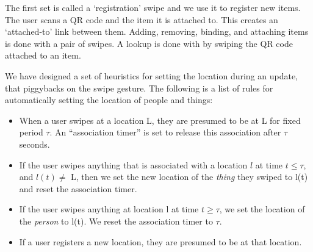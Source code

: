 
The first set is called a `registration' swipe and we use it to register new items.  The user scans a QR code and the item it is attached
to.  This creates an `attached-to' link between them.  Adding, removing, binding, and attaching items is done with a pair of swipes.
A lookup is done with by swiping the QR code attached to an item.

We have designed a set of heuristics for setting the location during an update, that piggybacks on the swipe gesture.
The following is a list of rules for automatically setting the location of people and things:

\begin{itemize}
\item When a user swipes at a location L, they are presumed to be at L for fixed period $\tau$.  An ``association timer'' is set to 
        release this association after $\tau$ seconds.
\item If the user swipes anything that is associated with a location $l$ at time $t \le \tau$, and $l(t)\ne$ L, 
        then we set the new location of the \emph{thing} they swiped to l(t) and reset the association timer.
\item If the user swipes anything at location l at time $t \ge \tau$, we set the location of the \emph{person} to l(t).
        We reset the association timer to $\tau$.
\item If a user registers a new location, they are presumed to be at that location.
\end{itemize}
\vspace{0.08in}


